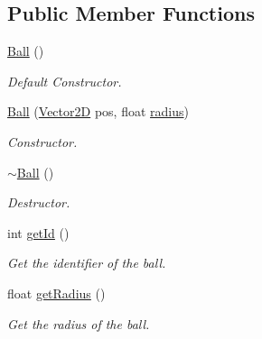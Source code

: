 \subsection*{Public Member Functions}
\begin{DoxyCompactItemize}
\item 
\mbox{\label{class_ball_a86a144d3dad6c953e422e32435923bbb}} 
\mbox{\hyperlink{class_ball_a86a144d3dad6c953e422e32435923bbb}{Ball}} ()
\begin{DoxyCompactList}\small\item\em Default Constructor. \end{DoxyCompactList}\item 
\mbox{\label{class_ball_a37ca32a1d22856c568e7d32a12212e05}} 
\mbox{\hyperlink{class_ball_a37ca32a1d22856c568e7d32a12212e05}{Ball}} (\mbox{\hyperlink{struct_vector2_d}{Vector2D}} pos, float \mbox{\hyperlink{class_ball_a86bfb032007c736e06c2295a8070d620}{radius}})
\begin{DoxyCompactList}\small\item\em Constructor. \end{DoxyCompactList}\item 
\mbox{\label{class_ball_a20f2f6ac0bf648f406a8e12e63429fcd}} 
\mbox{\hyperlink{class_ball_a20f2f6ac0bf648f406a8e12e63429fcd}{$\sim$\+Ball}} ()
\begin{DoxyCompactList}\small\item\em Destructor. \end{DoxyCompactList}\item 
\mbox{\label{class_ball_adcb90c274e3455d2507b4f665324a15b}} 
int \mbox{\hyperlink{class_ball_adcb90c274e3455d2507b4f665324a15b}{get\+Id}} ()
\begin{DoxyCompactList}\small\item\em Get the identifier of the ball. \end{DoxyCompactList}\item 
\mbox{\label{class_ball_a01a1890f5a86e8caeb4f91660a4f5700}} 
float \mbox{\hyperlink{class_ball_a01a1890f5a86e8caeb4f91660a4f5700}{get\+Radius}} ()
\begin{DoxyCompactList}\small\item\em Get the radius of the ball. \end{DoxyCompactList}\item 

\end{DoxyCompactItemize}
